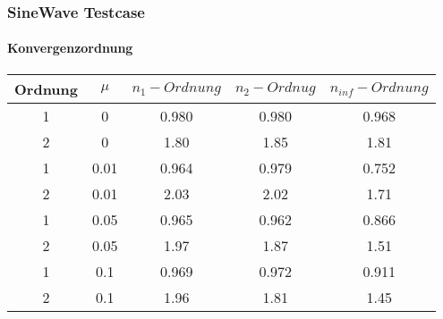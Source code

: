 \documentclass[
	11pt, %
	aspectratio=169, %
]{beamer}
\begin{document}
\begin{frame}
	\frametitle{SineWave Testcase}
	\framesubtitle{Konvergenzordnung}

	\begin{tabular}{|c|c|c|c|c|}
		\hline
		Ordnung & $\mu$  & $n_1-Ordnung$& $n_2-Ordnug$& $n_{inf}-Ordnung$\\
		\hline
		1 & 0 & 0.980 & 0.980 & 0.968 \\
		\hline
		2 & 0 & 1.80 & 1.85 & 1.81 \\
		\hline
		1 & 0.01 & 0.964 & 0.979 & 0.752 \\
		\hline
		2 & 0.01 & 2.03& 2.02 & 1.71 \\
		\hline
		1 & 0.05 & 0.965& 0.962 & 0.866 \\
		\hline
		2 & 0.05 &1.97 & 1.87 & 1.51 \\
		\hline
		1 & 0.1 & 0.969& 0.972 & 0.911 \\
		\hline
		2 & 0.1 & 1.96& 1.81 & 1.45 \\
		\hline
		\end{tabular}


	\end{frame}
\end{document}

